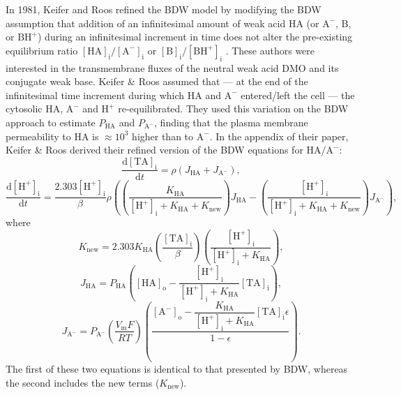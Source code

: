\documentclass[fleqn,10pt]{physiome}
\begin{document}
In 1981, Keifer and Roos refined the BDW model by modifying the BDW assumption that addition of an infinitesimal amount of weak acid $\mathrm{HA}$ (or $\mathrm{A^-}$, $\mathrm{B}$, or $\mathrm{BH^+}$) during an infinitesimal increment in time does not alter the pre-existing equilibrium ratio $\mathrm{[HA]_i}/\mathrm{[A^-]_i}$ or $\mathrm{[B]_i}/\mathrm{[BH^+]_i}$ \citep{keifer1981membrane}. These authors were interested in the transmembrane fluxes of the neutral weak acid DMO and its conjugate weak base. Keifer \& Roos assumed that --- at the end of the infinitesimal time increment during which $\mathrm{HA}$ and $\mathrm{A^-}$ entered/left the cell --- the cytosolic $\mathrm{HA}$, $\mathrm{A^-}$ and $\mathrm{H^+}$ re-equilibrated. They used this variation on the BDW approach to estimate $P_\mathrm{HA}$ and $P_\mathrm{A^-}$, finding that the plasma membrane permeability to $\mathrm{HA}$ is $\approx 10^3$ higher than to $\mathrm{A^-}$. In the appendix of their paper, Keifer \& Roos derived their refined version of the BDW equations for $\mathrm{HA}/\mathrm{A^-}$:
\begin{equation*}
\dfrac{\mathrm{d[TA]_i}}{\mathrm{d}t}=\rho\left(J_\mathrm{HA}+J_\mathrm{A^-}\right),
\label{eqn:keifer}
\end{equation*}
\begin{equation*}
\dfrac{\mathrm{d[H^+]_i}}{\mathrm{d}t}=\dfrac{2.303\mathrm{[H^+]_i}}{\beta}\rho\left(\left(\dfrac{K_\mathrm{HA}}{\mathrm{[H^+]_i}+K_\mathrm{HA}+{K_\mathrm{new}}}\right)J_\mathrm{HA}-\left(\dfrac{\mathrm{[H^+]_i}}{\mathrm{[H^+]_i}+K_\mathrm{HA}+{K_\mathrm{new}}}\right)J_\mathrm{A^-} \right),
\label{eqn:keifer2}
\end{equation*}
where
\begin{equation*}
K_\mathrm{new}=2.303K_\mathrm{HA}\left( \dfrac{\mathrm{[TA]_i}}{\beta}\right)\left( \dfrac{\mathrm{[H^+]_i}}{\mathrm{[H^+]_i}+K_\mathrm{HA}}\right),
\end{equation*}
\begin{equation*}
J_\mathrm{HA}=P_\mathrm{HA}\left( \mathrm{[HA]_o}-\dfrac{\mathrm{[H^+]_i}}{\mathrm{[H^+]_i}+K_\mathrm{{HA}}}\mathrm{[TA]_i} \right),
\end{equation*}
\begin{equation*}
J_\mathrm{A^-}=P_\mathrm{A^-}\left(\dfrac{V_\mathrm{m}F}{RT}\right)\left(\dfrac{\mathrm{[A^-]_o}-\dfrac{K_\mathrm{HA}}{\mathrm{[H^+]_i}+K_\mathrm{HA}}\mathrm{[TA]_i} \epsilon}{1-\epsilon}\right).
\end{equation*}
The first of these two equations is identical to that presented by BDW, whereas the second includes the new terms ($K_\mathrm{new}$).
\end{document}
